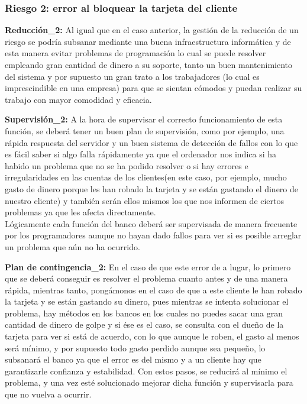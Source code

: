 \subsubsection{Riesgo 2: error al bloquear la tarjeta del cliente}
\textbf{Reducción\_2:} Al igual que en el caso anterior, la gestión de la reducción de un riesgo se podría subsanar mediante una buena infraestructura informática y de esta manera evitar problemas de programación lo cual se puede resolver empleando gran cantidad de dinero a su soporte, tanto un buen mantenimiento del sistema y por supuesto un gran trato a los trabajadores (lo cual es imprescindible en una empresa) para que se sientan cómodos y puedan realizar su trabajo con mayor comodidad y eficacia.

\textbf{Supervisión\_2:} A la hora de supervisar el correcto funcionamiento de esta función, se deberá tener un buen plan de supervisión, como por ejemplo, una rápida respuesta del servidor y un buen sistema de detección de fallos con lo que es fácil saber si algo falla rápidamente ya que el ordenador nos indica si ha habido un problema que no se ha podido resolver o si hay errores e irregularidades en las cuentas de los clientes(en este caso, por ejemplo, mucho gasto de dinero porque les han robado la tarjeta y se están gastando el dinero de nuestro cliente) y también serán ellos mismos los que nos informen de ciertos problemas ya que les afecta directamente.\\
Lógicamente cada función del banco deberá ser supervisada de manera frecuente por los programadores aunque no hayan dado fallos para ver si es posible arreglar un problema que aún no ha ocurrido.

\textbf{Plan de contingencia\_2:} En el caso de que este error de a lugar, lo primero que se deberá conseguir es resolver el problema cuanto antes y de una manera rápida, mientras tanto, pongámonos en el caso de que a este cliente le han robado la tarjeta y se están gastando su dinero, pues mientras se intenta solucionar el problema, hay métodos en los bancos en los cuales no puedes sacar una gran cantidad de dinero de golpe y si ése es el caso, se consulta con el dueño de la tarjeta para ver si está de acuerdo, con lo que aunque le roben,  el gasto al menos será mínimo, y por supuesto todo gasto perdido aunque sea pequeño, lo subsanará el banco ya que el error es del mismo y a un cliente hay que garantizarle confianza y estabilidad.
Con estos pasos, se reducirá al mínimo el problema, y una vez esté solucionado mejorar dicha función y supervisarla para que no vuelva a ocurrir.
